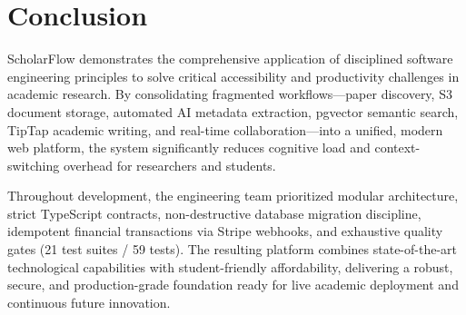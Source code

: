 \section{Conclusion}
ScholarFlow demonstrates the comprehensive application of disciplined software engineering principles to solve critical accessibility and productivity challenges in academic research. By consolidating fragmented workflows---paper discovery, S3 document storage, automated AI metadata extraction, pgvector semantic search, TipTap academic writing, and real-time collaboration---into a unified, modern web platform, the system significantly reduces cognitive load and context-switching overhead for researchers and students.

Throughout development, the engineering team prioritized modular architecture, strict TypeScript contracts, non-destructive database migration discipline, idempotent financial transactions via Stripe webhooks, and exhaustive quality gates (21 test suites / 59 tests). The resulting platform combines state-of-the-art technological capabilities with student-friendly affordability, delivering a robust, secure, and production-grade foundation ready for live academic deployment and continuous future innovation.

